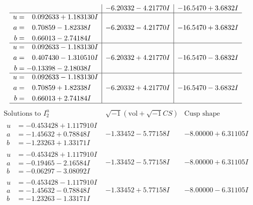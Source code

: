 \documentclass[1p]{elsarticle_modified}
\theoremstyle{definition}
\newcommand{\I}{\sqrt{-1}}
\begin{document}
$$\begin{array}{c|c|c}
 & -6.20332 - 4.21770 I & -16.5470 + 3.6832 I \\ \hline\begin{aligned}
u &= \phantom{-}0.092633 + 1.183130 I \\
a &= \phantom{-}0.70859 - 1.82338 I \\
b &= \phantom{-}0.66013 - 2.74184 I\end{aligned}
 & -6.20332 - 4.21770 I & -16.5470 + 3.6832 I \\ \hline\begin{aligned}
u &= \phantom{-}0.092633 - 1.183130 I \\
a &= \phantom{-}0.407430 - 1.310510 I \\
b &= -0.13398 - 2.18038 I\end{aligned}
 & -6.20332 + 4.21770 I & -16.5470 - 3.6832 I \\ \hline\begin{aligned}
u &= \phantom{-}0.092633 - 1.183130 I \\
a &= \phantom{-}0.70859 + 1.82338 I \\
b &= \phantom{-}0.66013 + 2.74184 I\end{aligned}
 & -6.20332 + 4.21770 I & -16.5470 - 3.6832 I\\
 \hline 
 \end{array}$$\newpage$$\begin{array}{c|c|c}  
\text{Solutions to }I^u_{2}& \I (\text{vol} + \sqrt{-1}CS) & \text{Cusp shape}\\
 \hline 
\begin{aligned}
u &= -0.453428 + 1.117910 I \\
a &= -1.45632 + 0.78848 I \\
b &= -1.23263 + 1.33171 I\end{aligned}
 & -1.33452 - 5.77158 I & -8.00000 + 6.31105 I \\ \hline\begin{aligned}
u &= -0.453428 + 1.117910 I \\
a &= -0.19465 - 2.16584 I \\
b &= -0.06297 - 3.08092 I\end{aligned}
 & -1.33452 - 5.77158 I & -8.00000 + 6.31105 I \\ \hline\begin{aligned}
u &= -0.453428 - 1.117910 I \\
a &= -1.45632 - 0.78848 I \\
b &= -1.23263 - 1.33171 I\end{aligned}
 & -1.33452 + 5.77158 I & -8.00000 - 6.31105 I \\ \hline\begin{aligned}

\end{aligned}
\end{array}$$
\end{document}
